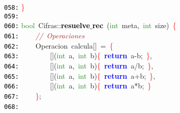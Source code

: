 \documentclass[a4paper,10pt]{scrartcl}
\begin{document}
{   \mbox{}\texttt{\textcolor{Black}{058:}} \textcolor{Red}{\}} \\
   \mbox{}\texttt{\textcolor{Black}{059:}}  \\
   \mbox{}\texttt{\textcolor{Black}{060:}} \textcolor{ForestGreen}{bool}\ Cifras\textcolor{BrickRed}{::}\textbf{\textcolor{Black}{resuelve$\_$rec}}\ \textcolor{BrickRed}{(}\textcolor{ForestGreen}{int}\ meta\textcolor{BrickRed}{,}\ \textcolor{ForestGreen}{int}\ size\textcolor{BrickRed}{)}\ \textcolor{Red}{\{} \\
   \mbox{}\texttt{\textcolor{Black}{061:}} \ \ \ \ \textit{\textcolor{Brown}{//\ Operaciones}} \\
   \mbox{}\texttt{\textcolor{Black}{062:}} \ \ \ \ \textcolor{TealBlue}{Operacion}\ calcula\textcolor{BrickRed}{[]}\ \textcolor{BrickRed}{=}\ \textcolor{Red}{\{} \\
   \mbox{}\texttt{\textcolor{Black}{063:}} \ \ \ \ \ \ \ \ \textcolor{BrickRed}{[](}\textcolor{ForestGreen}{int}\ a\textcolor{BrickRed}{,}\ \textcolor{ForestGreen}{int}\ b\textcolor{BrickRed}{)}\textcolor{Red}{\{}\ \textbf{\textcolor{Blue}{return}}\ a\textcolor{BrickRed}{-}b\textcolor{BrickRed}{;}\ \textcolor{Red}{\}}\textcolor{BrickRed}{,} \\
   \mbox{}\texttt{\textcolor{Black}{064:}} \ \ \ \ \ \ \ \ \textcolor{BrickRed}{[](}\textcolor{ForestGreen}{int}\ a\textcolor{BrickRed}{,}\ \textcolor{ForestGreen}{int}\ b\textcolor{BrickRed}{)}\textcolor{Red}{\{}\ \textbf{\textcolor{Blue}{return}}\ a\textcolor{BrickRed}{/}b\textcolor{BrickRed}{;}\ \textcolor{Red}{\}}\textcolor{BrickRed}{,} \\
   \mbox{}\texttt{\textcolor{Black}{065:}} \ \ \ \ \ \ \ \ \textcolor{BrickRed}{[](}\textcolor{ForestGreen}{int}\ a\textcolor{BrickRed}{,}\ \textcolor{ForestGreen}{int}\ b\textcolor{BrickRed}{)}\textcolor{Red}{\{}\ \textbf{\textcolor{Blue}{return}}\ a\textcolor{BrickRed}{+}b\textcolor{BrickRed}{;}\ \textcolor{Red}{\}}\textcolor{BrickRed}{,} \\
   \mbox{}\texttt{\textcolor{Black}{066:}} \ \ \ \ \ \ \ \ \textcolor{BrickRed}{[](}\textcolor{ForestGreen}{int}\ a\textcolor{BrickRed}{,}\ \textcolor{ForestGreen}{int}\ b\textcolor{BrickRed}{)}\textcolor{Red}{\{}\ \textbf{\textcolor{Blue}{return}}\ a\textcolor{BrickRed}{*}b\textcolor{BrickRed}{;}\ \textcolor{Red}{\}} \\
   \mbox{}\texttt{\textcolor{Black}{067:}} \ \ \ \ \textcolor{Red}{\}}\textcolor{BrickRed}{;} \\
   \mbox{}\texttt{\textcolor{Black}{068:}} \ \ \ \  \\
}
\end{document}
